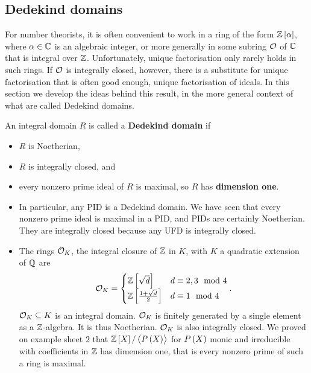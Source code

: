 
\subsection{Dedekind domains}

For number theorists, it is often convenient to work in a ring of the form $ \Z\sbr{\alpha} $, where $ \alpha \in \mathbb{C} $ is an algebraic integer, or more generally in some subring $ \mathcal{O} $ of $ \mathbb{C} $ that is integral over $ \mathbb{Z} $. Unfortunately, unique factorisation only rarely holds in such rings. If $ \mathcal{O} $ is integrally closed, however, there is a substitute for unique factorisation that is often good enough, unique factorisation of ideals. In this section we develop the ideas behind this result, in the more general context of what are called Dedekind domains.

\begin{definition}
An integral domain $ R $ is called a \textbf{Dedekind domain} if
\begin{itemize}
\item $ R $ is Noetherian,
\item $ R $ is integrally closed, and
\item every nonzero prime ideal of $ R $ is maximal, so $ R $ has \textbf{dimension one}.
\end{itemize}
\end{definition}

\begin{example*}
\hfill
\begin{itemize}
\item In particular, any PID is a Dedekind domain. We have seen that every nonzero prime ideal is maximal in a PID, and PIDs are certainly Noetherian. They are integrally closed because any UFD is integrally closed.
\item The rings $ \mathcal{O}_K $, the integral closure of $ \mathbb{Z} $ in $ K $, with $ K $ a quadratic extension of $ \mathbb{Q} $ are
$$ \OO_K =
\begin{cases}
\Z\sbr{\sqrt{d}} & d \equiv 2, 3 \mod 4 \\
\Z\sbr{\tfrac{1 + \sqrt{d}}{2}} & d \equiv 1 \mod 4
\end{cases}.
$$
$ \mathcal{O}_K \subseteq K $ is an integral domain. $ \mathcal{O}_K $ is finitely generated by a single element as a $ \mathbb{Z} $-algebra. It is thus Noetherian. $ \mathcal{O}_K $ is also integrally closed. We proved on example sheet $ 2 $ that $ \Z\sbr{X} / \abr{P\br{X}} $ for $ P\br{X} $ monic and irreducible with coefficients in $ \mathbb{Z} $ has dimension one, that is every nonzero prime of such a ring is maximal.
\end{itemize}
\end{example*}

